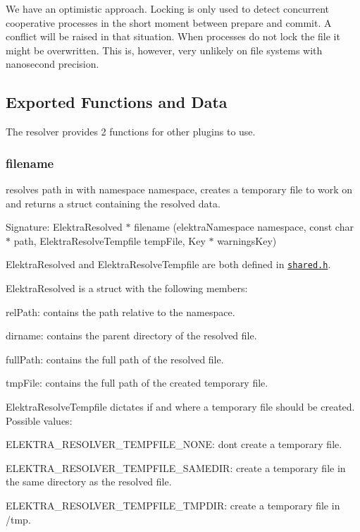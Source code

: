 We have an optimistic approach. Locking is only used to detect concurrent cooperative processes in the short moment between prepare and commit. A conflict will be raised in that situation. When processes do not lock the file it might be overwritten. This is, however, very unlikely on file systems with nanosecond precision.

\subsection*{Exported Functions and Data}

The resolver provides 2 functions for other plugins to use.

\subsubsection*{filename}

resolves {\ttfamily path} in with namespace {\ttfamily namespace}, creates a temporary file to work on and returns a struct containing the resolved data.

Signature\+: {\ttfamily Elektra\+Resolved $\ast$ filename (elektra\+Namespace namespace, const char $\ast$ path, Elektra\+Resolve\+Tempfile temp\+File, Key $\ast$ warnings\+Key)}

{\ttfamily Elektra\+Resolved} and {\ttfamily Elektra\+Resolve\+Tempfile} are both defined in \href{/home/markus/Projekte/Elektra/current/src/plugins/resolver/shared.h}{\tt shared.\+h}.

{\ttfamily Elektra\+Resolved} is a struct with the following members\+:


\begin{DoxyItemize}
\item {\ttfamily rel\+Path}\+: contains the path relative to the namespace.
\item {\ttfamily dirname}\+: contains the parent directory of the resolved file.
\item {\ttfamily full\+Path}\+: contains the full path of the resolved file.
\item {\ttfamily tmp\+File}\+: contains the full path of the created temporary file.
\end{DoxyItemize}

{\ttfamily Elektra\+Resolve\+Tempfile} dictates if and where a temporary file should be created. Possible values\+:


\begin{DoxyItemize}
\item {\ttfamily E\+L\+E\+K\+T\+R\+A\+\_\+\+R\+E\+S\+O\+L\+V\+E\+R\+\_\+\+T\+E\+M\+P\+F\+I\+L\+E\+\_\+\+N\+O\+NE}\+: don\textquotesingle{}t create a temporary file.
\item {\ttfamily E\+L\+E\+K\+T\+R\+A\+\_\+\+R\+E\+S\+O\+L\+V\+E\+R\+\_\+\+T\+E\+M\+P\+F\+I\+L\+E\+\_\+\+S\+A\+M\+E\+D\+IR}\+: create a temporary file in the same directory as the resolved file.
\item {\ttfamily E\+L\+E\+K\+T\+R\+A\+\_\+\+R\+E\+S\+O\+L\+V\+E\+R\+\_\+\+T\+E\+M\+P\+F\+I\+L\+E\+\_\+\+T\+M\+P\+D\+IR}\+: create a temporary file in {\ttfamily /tmp}.
\end{DoxyItemize}

